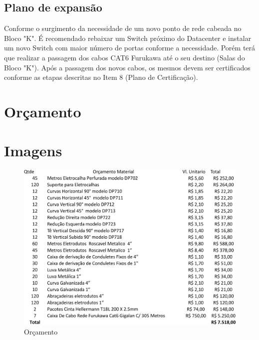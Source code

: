 \documentclass[	DIV=calc,%
paper=a4,%
fontsize=12pt,%
onecolumn]{scrartcl}	 					%
\begin{document}
	
	\subsection{Plano de expansão}
	
	Conforme o surgimento da necessidade de um novo ponto de rede cabeada no Bloco "K". É recomendado  rebaixar um Switch próximo do Datacenter e instalar um novo Switch com maior número de portas conforme a necessidade. Porém terá que realizar a passagem dos cabos CAT6 Furukawa até o seu destino (Salas do Bloco "K"). Após a passagem dos novos cabos, os mesmos devem ser certificados conforme as etapas descritas no Item 8 (Plano de Certificação).
	
	\section{Orçamento}
	
	\section{Imagens}
	\begin{figure}[!h]
		\caption{Orçamento}
		\includegraphics{orcamento}
	\end{figure}

	
\end{document}
